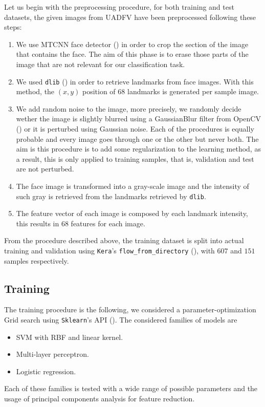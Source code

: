 \documentclass[11pt]{article}
\begin{document}
Let us begin with the preprocessing procedure, for both training and test datasets, the given images from UADFV have been preprocessed following these steps:
\begin{enumerate}
  \item We use MTCNN face detector (\cite{zhang2016joint}) in order to crop the section of the image that contains the face. The aim of this phase is to erase those parts of the image that are not relevant for our classification task.
  \item We used \texttt{dlib} (\cite{dlib09}) in order to retrieve landmarks from face images. With this method, the \( (x,y) \) position of \( 68 \) landmarks is generated per sample image.
  \item We add random noise to the image, more precisely, we randomly decide wether the image is slightly blurred using a GaussianBlur filter from OpenCV (\cite{opencv_library}) or it is perturbed using Gaussian noise. Each of the procedures is equally probable and every image goes through one or the other but never both. The aim is this procedure is to add some regularization to the learning method, as a result, this is only applied to training samples, that is, validation and test are not perturbed.
  \item The face image is transformed into a gray-scale image and the intensity of such gray is retrieved from the landmarks retrieved by \texttt{dlib}.
  \item The feature vector of each image is composed by each landmark intensity, this results in 68 features for each image.
\end{enumerate}

From the procedure described above, the training dataset is split into actual training and validation using \texttt{Kera}'s  \texttt{flow\_from\_directory} (\cite{chollet2015keras}), with \( 607 \) and \( 151 \) samples respectively.

\subsection*{Training}
The training procedure is the following, we considered a parameter-optimization Grid search using \texttt{Sklearn}'s API (\cite{sklearn_api}). The considered families of models are
\begin{itemize}
  \item SVM with RBF and linear kernel.
  \item Multi-layer perceptron.
  \item Logistic regression.
\end{itemize}
Each of these families is tested with a wide range of possible parameters and the usage of principal components analysis for feature reduction. 
\end{document}

